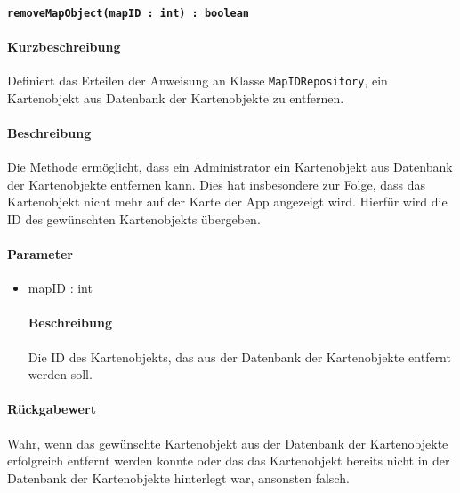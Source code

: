 \paragraph{\texttt{removeMapObject(mapID : int) : boolean}}%
\paragraph*{Kurzbeschreibung}
Definiert das Erteilen der Anweisung an Klasse \texttt{MapIDRepository}, ein Kartenobjekt aus Datenbank der Kartenobjekte zu entfernen.
\paragraph*{Beschreibung}
Die Methode ermöglicht, dass ein Administrator ein Kartenobjekt aus Datenbank der Kartenobjekte entfernen kann.
Dies hat insbesondere zur Folge, dass das Kartenobjekt nicht mehr auf der Karte der App angezeigt wird.
Hierfür wird die ID des gewünschten Kartenobjekts übergeben.
\paragraph*{Parameter}
\begin{itemize}
    \item mapID : int
    		\paragraph*{Beschreibung}
    		Die ID des Kartenobjekts, das aus der Datenbank der Kartenobjekte entfernt werden soll.
\end{itemize}
\paragraph*{Rückgabewert}
Wahr, wenn das gewünschte Kartenobjekt aus der Datenbank der Kartenobjekte erfolgreich entfernt werden konnte oder das das Kartenobjekt bereits nicht in der Datenbank der Kartenobjekte hinterlegt war, ansonsten falsch.
